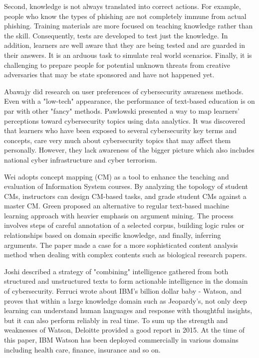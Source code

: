 \documentclass{article} %
\begin{document}
Second, knowledge is not always translated into correct actions. For example, people who know the types of phishing are not completely immune from actual phishing. Training materials are more focused on teaching knowledge rather than the skill. Consequently, tests are developed to test just the knowledge. In addition, learners are well aware that they are being tested and are guarded in their answers. It is an arduous task to simulate real world scenarios. Finally, it is challenging to prepare people for potential unknown threats from creative adversaries that may be state sponsored and have not happened yet.

Abawajy \cite{Abawajy2014UserMethods} did research on user preferences of cybersecurity awareness methods. Even with a "low-tech" appearance, the performance of text-based education is on par with other "fancy" methods. Pawlowski \cite{Pawlowski2016SocialDesign} presented a way to map learners' perceptions toward cybersecurity topics using data analytics. It was discovered that learners who have been exposed to several cybersecurity key terms and concepts, care very much about cybersecurity topics that may affect them personally. However, they lack awareness of the bigger picture which also includes national cyber infrastructure and cyber terrorism.

Wei \cite{Wei2017IntegratingAssessment} adopts concept mapping (CM) as a tool to enhance the teaching and evaluation of Information System courses. By analyzing the topology of student CMs, instructors can design CM-based tasks, and grade student CMs against a master CM. Green \cite{Green2018TowardsSchemes} proposed an alternative to regular text-based machine learning approach with heavier emphasis on argument mining. The process involves steps of careful annotation of a selected corpus, building logic rules or relationships based on domain specific knowledge, and finally, inferring arguments. The paper made a case for a more sophisticated content analysis method when dealing with complex contents such as biological research papers.

Joshi \cite{Joshi2013ExtractingText} described a strategy of "combining" intelligence gathered from both structured and unstructured texts to form actionable intelligence in the domain of cybersecurity. Ferruci \cite{Ferrucci2010BuildingProject} wrote about IBM's billion dollar baby - Watson, and proves that within a large knowledge domain such as Jeopardy's, not only deep learning can understand human languages and response with thoughtful insights, but it can also perform reliably in real time. To sum up the strength and weaknesses of Watson, Deloitte provided a good report \cite{DeloitteDevelopment2015DisruptionWatson} in 2015. At the time of this paper, IBM Watson has been deployed commercially in various domains including health care, finance, insurance and so on.
\end{document}
